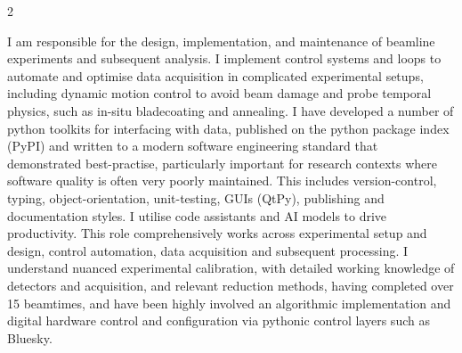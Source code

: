 \documentclass[10pt,a4paper,ragged2e,withhyper]{altacv}
\begin{document}
\begin{paracol}{2}
         	    	
	\vspace{-1em}
		
		\vspace{0.5em}
		I am responsible for the design, implementation, and maintenance of beamline experiments and subsequent analysis. I implement control systems and loops to automate and optimise data acquisition in complicated experimental setups, including dynamic motion control to avoid beam damage and probe temporal physics, such as in-situ bladecoating and annealing.
		I have developed a number of python toolkits for interfacing with data, published on the python package index (PyPI) and written to a modern software engineering standard that demonstrated best-practise, particularly important for research contexts where software quality is often very poorly maintained. 
		This includes version-control, typing, object-orientation, unit-testing, GUIs (QtPy), publishing and documentation styles. 
		I utilise code assistants and AI models to drive productivity.
		This role comprehensively works across experimental setup and design, control automation, data acquisition and subsequent processing. I understand nuanced experimental calibration, with detailed working knowledge of detectors and acquisition, and relevant reduction methods, having completed over 15 beamtimes, and have been highly involved an algorithmic implementation and digital hardware control and configuration via pythonic control layers such as Bluesky.
		
        \end{paracol}
		\divider
\end{document}
